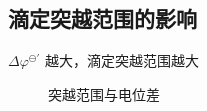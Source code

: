 \subsection{滴定突越范围的影响}%
\label{sub:滴定突越范围的影响}
$\Delta\varphi ^{\ominus'} $ 越大，滴定突越范围越大
\begin{figure}[ht]
    \centering
    \caption{突越范围与电位差}
    \label{fig:突越范围与电位差}
\end{figure}

